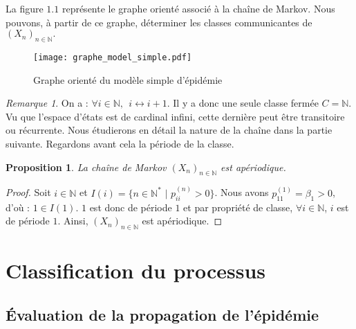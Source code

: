 \documentclass[12pt,a4paper]{report}
\newtheorem{prop}[thm]{Proposition}
\theoremstyle{remark}
\newtheorem*{remark}{Remarque}
\begin{document}
La figure $1.1$ représente le graphe orienté associé à la chaîne de Markov. Nous pouvons, à partir de ce graphe, déterminer les classes communicantes de $(X_n)_{n \in \mathbb{N}}.$

\begin{figure}[h]
    \centering
    \texttt{[image: graphe\_model\_simple.pdf]}
    \caption{Graphe orienté du modèle simple d'épidémie}
    \label{fig:my_label}
\end{figure}

\begin{remark}
On a : $\forall i \in \mathbb{N},\ \  i \longleftrightarrow i+1$.
Il y a donc une seule classe fermée $C=\mathbb{N}$. Vu que l'espace d'états est de cardinal infini, cette dernière peut être transitoire ou récurrente. Nous étudierons en détail la nature de la chaîne dans la partie suivante. Regardons avant cela la période de la classe.
\end{remark}

\begin{prop}\label{aperiodique}
La chaîne de Markov $(X_n)_{n \in \mathbb{N}}$ est apériodique.
\end{prop}
\begin{proof}
Soit $i \in \mathbb{N}$ et $I(i) = \{n \in \mathbb{N}^* \, \, | \, \,p_{ii}^{(n)} > 0\}$. Nous avons $p_{11}^{(1)} = \beta_1 > 0$, d'où : $1 \in I(1)$. $1$ est donc de période $1$ et par propriété de classe, $\forall i \in \mathbb{N}$, $i$ est de période $1$. Ainsi, $(X_n)_{n \in \mathbb{N}}$ est apériodique.
\end{proof}

\section{Classification du processus}

\subsection{Évaluation de la propagation de l'épidémie}
\vspace{0.6cm}
\end{document}

